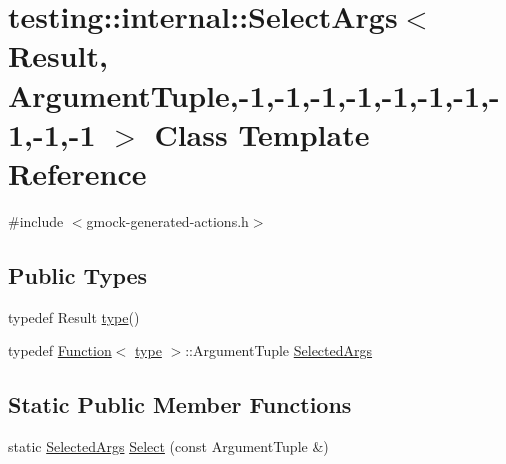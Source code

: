 \hypertarget{classtesting_1_1internal_1_1_select_args_3_01_result_00_01_argument_tuple_00-1_00-1_00-1_00-1_005f626e5adb9246c46f665dbb755b50f6}{}\section{testing\+:\+:internal\+:\+:Select\+Args$<$ Result, Argument\+Tuple,-\/1,-\/1,-\/1,-\/1,-\/1,-\/1,-\/1,-\/1,-\/1,-\/1 $>$ Class Template Reference}
\label{classtesting_1_1internal_1_1_select_args_3_01_result_00_01_argument_tuple_00-1_00-1_00-1_00-1_005f626e5adb9246c46f665dbb755b50f6}


{\ttfamily \#include $<$gmock-\/generated-\/actions.\+h$>$}

\subsection*{Public Types}
\begin{DoxyCompactItemize}
\item 
typedef Result \hyperlink{classtesting_1_1internal_1_1_select_args_3_01_result_00_01_argument_tuple_00-1_00-1_00-1_00-1_005f626e5adb9246c46f665dbb755b50f6_ac0cd24f2f3bd5f52b1a864e4dd380322}{type}()
\item 
typedef \hyperlink{structtesting_1_1internal_1_1_function}{Function}$<$ \hyperlink{classtesting_1_1internal_1_1_select_args_3_01_result_00_01_argument_tuple_00-1_00-1_00-1_00-1_005f626e5adb9246c46f665dbb755b50f6_ac0cd24f2f3bd5f52b1a864e4dd380322}{type} $>$\+::Argument\+Tuple \hyperlink{classtesting_1_1internal_1_1_select_args_3_01_result_00_01_argument_tuple_00-1_00-1_00-1_00-1_005f626e5adb9246c46f665dbb755b50f6_adc60d51fe96e09fd5e41b2a61f998c54}{Selected\+Args}
\end{DoxyCompactItemize}
\subsection*{Static Public Member Functions}
\begin{DoxyCompactItemize}
\item 
static \hyperlink{classtesting_1_1internal_1_1_select_args_3_01_result_00_01_argument_tuple_00-1_00-1_00-1_00-1_005f626e5adb9246c46f665dbb755b50f6_adc60d51fe96e09fd5e41b2a61f998c54}{Selected\+Args} \hyperlink{classtesting_1_1internal_1_1_select_args_3_01_result_00_01_argument_tuple_00-1_00-1_00-1_00-1_005f626e5adb9246c46f665dbb755b50f6_a909bc989f5f80ecd5fcab22899b1e121}{Select} (const Argument\+Tuple \&)
\end{DoxyCompactItemize}


